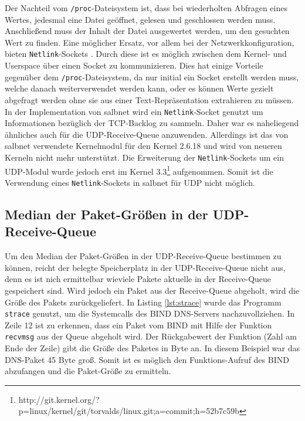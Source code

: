 \documentclass[a4paper, 12pt, BCOR10mm, DIV12, toc=bibliography, toc=listof, german]{scrbook}
\begin{document}
		Der Nachteil vom \texttt{/proc}-Dateisystem ist, dass bei wiederholten Abfragen eines Wertes,
		jedesmal eine Datei geöffnet, gelesen und geschlossen werden muss. Anschließend muss der Inhalt
		der Datei ausgewertet werden, um den gesuchten Wert zu finden. Eine möglicher Ersatz, vor allem
		bei der Netzwerkkonfiguration, bieten \texttt{Netlink}-Sockets \cite{rfc3549, gusowski2009}.
		Durch diese ist es möglich zwischen dem Kernel- und Userspace über einen Socket zu
		kommunizieren. Dies hat einige Vorteile gegenüber dem \texttt{/proc}-Dateisystem, da nur initial
		ein Socket erstellt werden muss, welche danach weiterverwendet werden kann, oder es können Werte
		gezielt abgefragt werden ohne sie aus einer Text-Repräsentation extrahieren zu müssen. In der
		Implementation von salbnet \cite{zinke2012} wird ein \texttt{Netlink}-Socket genutzt um
		Informationen bezüglich der TCP-Backlog zu sammeln. Daher war es naheliegend ähnliches auch für
		die UDP-Receive-Queue anzuwenden. Allerdings ist das von salbnet verwendete Kernelmodul für den
		Kernel 2.6.18 und wird von neueren Kerneln nicht mehr unterstützt. Die Erweiterung der
		\texttt{Netlink}-Sockets um ein UDP-Modul wurde jedoch erst im Kernel 3.3\footnote{http://git.kernel.org/?p=linux/kernel/git/torvalds/linux.git;a=commit;h=52b7c59b}
		aufgenommen. Somit ist die Verwendung eines \texttt{Netlink}-Sockets in salbnet für UDP nicht
		möglich.		

		


		\subsection*{Median der Paket-Größen in der UDP-Receive-Queue} %

		Um den Median der Paket-Größen in der UDP-Receive-Queue bestimmen zu können, reicht der belegte
		Speicherplatz in der UDP-Receive-Queue nicht aus, denn es ist nich ermittelbar wieviele Pakete
		aktuelle in der Receive-Queue gespeichert sind. Wird jedoch ein Paket aus der Receive-Queue
		abgeholt, wird die Größe des Pakets zurückgeliefert. In Listing \ref{lst:strace} wurde das
		Programm \texttt{strace} genutzt, um die Systemcalls des BIND DNS-Servers nachzuvollziehen. In
		Zeile 12 ist zu erkennen, dass ein Paket vom BIND mit Hilfe der Funktion \texttt{recvmsg} aus
		der Queue abgeholt wird. Der Rückgabewert der Funktion (Zahl am Ende der Zeile) gibt die Größe
		des Paketes in Byte an. In diesem Beispiel war das DNS-Paket 45 Byte groß. Somit ist es möglich
		den Funktions-Aufruf des BIND abzufangen und die Paket-Größe zu ermitteln.
\end{document}
